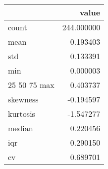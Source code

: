 \begin{tabular}{lr}
\toprule
 & value \\
\midrule
count & 244.000000 \\
mean & 0.193403 \\
std & 0.133391 \\
min & 0.000003 \\
25%
50%
75%
max & 0.403737 \\
skewness & -0.194597 \\
kurtosis & -1.547277 \\
median & 0.220456 \\
iqr & 0.290150 \\
cv & 0.689701 \\
\bottomrule
\end{tabular}
